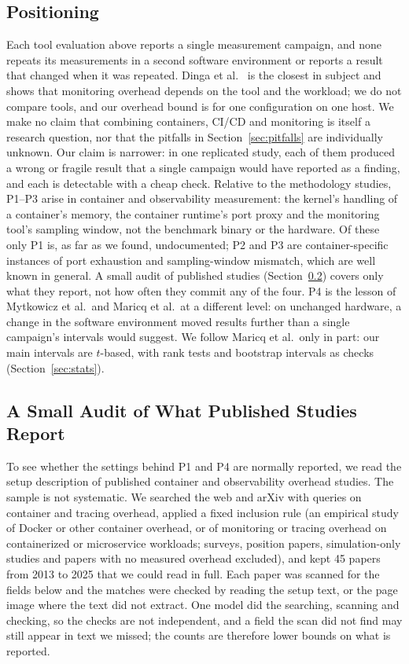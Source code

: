 \documentclass[conference]{IEEEtran}
\begin{document}
\subsection{Positioning}
Each tool evaluation above reports a single measurement campaign, and none repeats its
measurements in a second software environment or reports a result that changed when
it was repeated. Dinga et al.~\cite{dinga2023} is the closest in subject and shows
that monitoring overhead depends on the tool and the workload; we do not compare
tools, and our overhead bound is for one configuration on one host. We make no claim
that combining containers, CI/CD and monitoring is itself a research question, nor
that the pitfalls in Section~\ref{sec:pitfalls} are individually unknown. Our
claim is narrower: in one replicated study, each of them produced a wrong or
fragile result that a single campaign would have reported as a finding, and each is
detectable with a cheap check. Relative to the methodology studies, P1--P3 arise in
container and observability measurement: the kernel's handling of a container's memory,
the container runtime's port proxy and the monitoring tool's sampling window, not the
benchmark binary or the hardware. Of these only P1 is, as far as we found, undocumented;
P2 and P3 are container-specific instances of port exhaustion and sampling-window
mismatch, which are well known in general. A small audit of published studies
(Section~\ref{sec:audit}) covers only what they report, not how often they commit any of
the four. P4 is the lesson of Mytkowicz et
al.\ and Maricq et al.\ at a different level: on unchanged hardware, a change in the
software environment moved results further than a single campaign's intervals would
suggest. We follow Maricq et al.\ only in part: our main intervals are $t$-based, with
rank tests and bootstrap intervals as checks (Section~\ref{sec:stats}).

\subsection{A Small Audit of What Published Studies Report}
\label{sec:audit}
To see whether the settings behind P1 and P4 are normally reported, we read the setup
description of published container and observability overhead studies. The sample is
not systematic. We searched the web and arXiv with queries on container and tracing
overhead, applied a fixed inclusion rule (an empirical study of Docker or other
container overhead, or of monitoring or tracing overhead on containerized or
microservice workloads; surveys, position papers, simulation-only studies and papers with
no measured overhead excluded), and kept 45 papers from 2013 to 2025 that we could read in full.
Each paper was scanned for the fields below and the matches were checked by reading the
setup text, or the page image where the text did not extract. One model did the
searching, scanning and checking, so the checks are not independent, and a field the
scan did not find may still appear in text we missed; the counts are therefore lower
bounds on what is reported.
\end{document}
